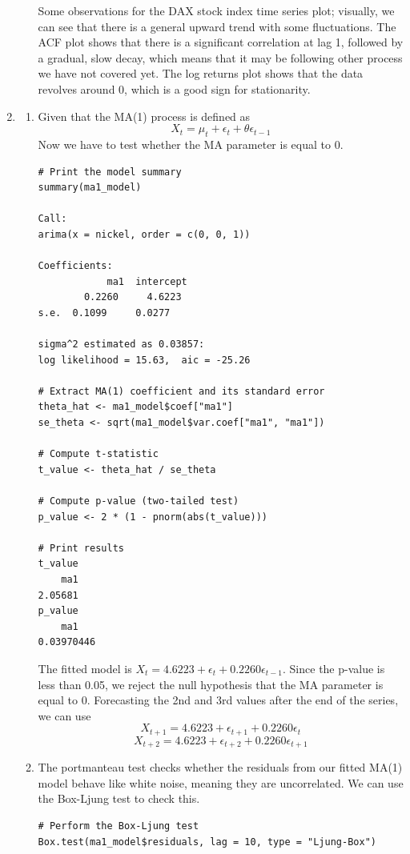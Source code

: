 \documentclass[12pt]{article}
\begin{document}
\begin{enumerate}
\begin{enumerate}
\begin{center}
    \end{center}
    Some observations for the DAX stock index time series plot; visually, we can see that
    there is a general upward trend with some fluctuations. The ACF plot shows that there is
    a significant correlation at lag 1, followed by a gradual, slow decay, which means that it
    may be following other process we have not covered yet. The log returns plot shows that 
    the data revolves around 0, which is a good sign for stationarity.
    \end{enumerate} 
    \item
    \begin{enumerate}
    \item Given that the MA(1) process is defined as
    \[
        X_t = \mu_t + \epsilon_t + \theta \epsilon_{t-1}
    \]
    Now we have to test whether the MA parameter is equal 
    to 0.
\begin{verbatim}
# Print the model summary
summary(ma1_model)

Call:
arima(x = nickel, order = c(0, 0, 1))

Coefficients:
            ma1  intercept
        0.2260     4.6223
s.e.  0.1099     0.0277

sigma^2 estimated as 0.03857:  
log likelihood = 15.63,  aic = -25.26

# Extract MA(1) coefficient and its standard error
theta_hat <- ma1_model$coef["ma1"]
se_theta <- sqrt(ma1_model$var.coef["ma1", "ma1"])

# Compute t-statistic
t_value <- theta_hat / se_theta

# Compute p-value (two-tailed test)
p_value <- 2 * (1 - pnorm(abs(t_value)))

# Print results
t_value
    ma1 
2.05681 
p_value
    ma1 
0.03970446
\end{verbatim}
    The fitted model is $X_t = 4.6223 + \epsilon_t + 0.2260 \epsilon_{t-1}$.
    Since the p-value is less than 0.05, we reject the null hypothesis that the MA parameter is equal to 0.
    Forecasting the 2nd and 3rd values after the end of the series, we can use
    \[
        X_{t+1} = 4.6223 + \epsilon_{t+1} + 0.2260 \epsilon_t
    \]
    \[
        X_{t+2} = 4.6223 + \epsilon_{t+2} + 0.2260 \epsilon_{t+1}
    \]
    \item The portmanteau test checks whether the residuals
    from our fitted MA(1) model behave like white noise, meaning they are uncorrelated.
    We can use the Box-Ljung test to check this.
\begin{verbatim}
# Perform the Box-Ljung test
Box.test(ma1_model$residuals, lag = 10, type = "Ljung-Box")


\end{verbatim}
\end{enumerate}
\end{enumerate}
\end{document}
